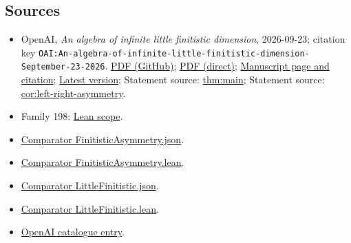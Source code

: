 \documentclass[11pt]{article}
\begin{document}
\subsection{Sources}
\begin{itemize}
\item OpenAI, \emph{An algebra of infinite little finitistic dimension}, 2026-09-23; citation key \texttt{OAI:An-algebra-of-infinite-little-finitistic-dimension-September-23-2026}. \href{https://github.com/openai/math/blob/adc7f1241b42e322a6451854ab7e4b4c146bf78a/preprints/An-algebra-of-infinite-little-finitistic-dimension-September-23-2026/paper.pdf}{PDF (GitHub)}; \href{https://github.com/openai/math/raw/adc7f1241b42e322a6451854ab7e4b4c146bf78a/preprints/An-algebra-of-infinite-little-finitistic-dimension-September-23-2026/paper.pdf}{PDF (direct)}; \href{https://github.com/openai/math/blob/adc7f1241b42e322a6451854ab7e4b4c146bf78a/preprints/An-algebra-of-infinite-little-finitistic-dimension-September-23-2026/README.md}{Manuscript page and citation}; \href{https://github.com/openai/math/blob/main/preprints/An-algebra-of-infinite-little-finitistic-dimension-September-23-2026/paper.pdf}{Latest version}; Statement source: \href{https://github.com/openai/math/blob/adc7f1241b42e322a6451854ab7e4b4c146bf78a/preprints/An-algebra-of-infinite-little-finitistic-dimension-September-23-2026/build/sections/01-introduction.tex\#L24}{thm:main}; Statement source: \href{https://github.com/openai/math/blob/adc7f1241b42e322a6451854ab7e4b4c146bf78a/preprints/An-algebra-of-infinite-little-finitistic-dimension-September-23-2026/build/sections/01-introduction.tex\#L91}{cor:left-right-asymmetry}.
\item Family 198: \href{https://github.com/openai/math/blob/adc7f1241b42e322a6451854ab7e4b4c146bf78a/lean/docs/198.md}{Lean scope}.
\item \href{https://github.com/openai/math/blob/adc7f1241b42e322a6451854ab7e4b4c146bf78a/lean/ComparatorChallenges/FinitisticAsymmetry.json}{Comparator FinitisticAsymmetry.json}.
\item \href{https://github.com/openai/math/blob/adc7f1241b42e322a6451854ab7e4b4c146bf78a/lean/ComparatorChallenges/FinitisticAsymmetry.lean}{Comparator FinitisticAsymmetry.lean}.
\item \href{https://github.com/openai/math/blob/adc7f1241b42e322a6451854ab7e4b4c146bf78a/lean/ComparatorChallenges/LittleFinitistic.json}{Comparator LittleFinitistic.json}.
\item \href{https://github.com/openai/math/blob/adc7f1241b42e322a6451854ab7e4b4c146bf78a/lean/ComparatorChallenges/LittleFinitistic.lean}{Comparator LittleFinitistic.lean}.
\item \href{https://github.com/openai/math/blob/adc7f1241b42e322a6451854ab7e4b4c146bf78a/CONTENTS.md}{OpenAI catalogue entry}.
\end{itemize}
\end{document}
